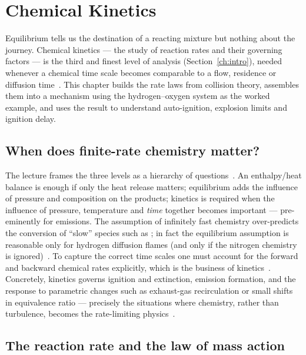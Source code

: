 \chapter{Chemical Kinetics}\label{ch:kinetics}

Equilibrium tells us the destination of a reacting mixture but nothing about the journey. Chemical kinetics --- the study of reaction rates and their governing factors --- is the third and finest level of analysis (Section~\ref{ch:intro}), needed whenever a chemical time scale becomes comparable to a flow, residence or diffusion time~\cite{lecture3}. This chapter builds the rate laws from collision theory, assembles them into a mechanism using the hydrogen--oxygen system as the worked example, and uses the result to understand auto-ignition, explosion limits and ignition delay.

\section{When does finite-rate chemistry matter?}

The lecture frames the three levels as a hierarchy of questions~\cite{lecture3}. An enthalpy/heat balance is enough if only the heat release matters; equilibrium adds the influence of pressure and composition on the products; kinetics is required when the influence of pressure, temperature and \emph{time} together becomes important --- pre-eminently for emissions. The assumption of infinitely fast chemistry over-predicts the conversion of ``slow'' species such as ; in fact the equilibrium assumption is reasonable only for hydrogen diffusion flames (and only if the nitrogen chemistry is ignored)~\cite{lecture3}. To capture the correct time scales one must account for the forward and backward chemical rates explicitly, which is the business of kinetics~\cite{lecture3}. Concretely, kinetics governs ignition and extinction, emission formation, and the response to parametric changes such as exhaust-gas recirculation or small shifts in equivalence ratio --- precisely the situations where chemistry, rather than turbulence, becomes the rate-limiting physics~\cite{lecture3}.

\section{The reaction rate and the law of mass action}

